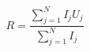 \documentclass[A4,11pt]{article}
\begin{document}
\thispagestyle{empty}
$$
R = \frac{\sum\limits_{j=1}^N I_jU_j}{\sum\limits_{j=1}^N I_j}
$$
\end{document}
